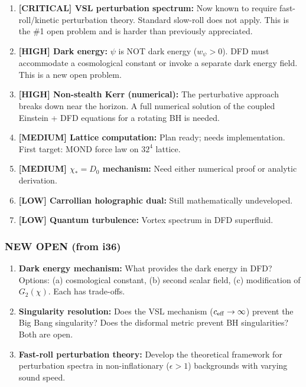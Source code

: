 \documentclass[11pt,a4paper]{article}
\begin{document}
\begin{enumerate}
\item \textbf{[CRITICAL] VSL perturbation spectrum:} Now known to require fast-roll/kinetic perturbation theory. Standard slow-roll does not apply. This is the \#1 open problem and is harder than previously appreciated.

\item \textbf{[HIGH] Dark energy:} $\psi$ is NOT dark energy ($w_\psi > 0$). DFD must accommodate a cosmological constant or invoke a separate dark energy field. This is a new open problem.

\item \textbf{[HIGH] Non-stealth Kerr (numerical):} The perturbative approach breaks down near the horizon. A full numerical solution of the coupled Einstein + DFD equations for a rotating BH is needed.

\item \textbf{[MEDIUM] Lattice computation:} Plan ready; needs implementation. First target: MOND force law on $32^4$ lattice.

\item \textbf{[MEDIUM] $\chi_* = D_0$ mechanism:} Need either numerical proof or analytic derivation.

\item \textbf{[LOW] Carrollian holographic dual:} Still mathematically undeveloped.

\item \textbf{[LOW] Quantum turbulence:} Vortex spectrum in DFD superfluid.
\end{enumerate}

\subsubsection{NEW OPEN (from i36)}

\begin{enumerate}
\item \textbf{Dark energy mechanism:} What provides the dark energy in DFD? Options: (a) cosmological constant, (b) second scalar field, (c) modification of $G_2(\chi)$. Each has trade-offs.

\item \textbf{Singularity resolution:} Does the VSL mechanism ($c_{\rm eff} \to \infty$) prevent the Big Bang singularity? Does the disformal metric prevent BH singularities? Both are open.

\item \textbf{Fast-roll perturbation theory:} Develop the theoretical framework for perturbation spectra in non-inflationary ($\epsilon > 1$) backgrounds with varying sound speed.
\end{enumerate}
\end{document}
